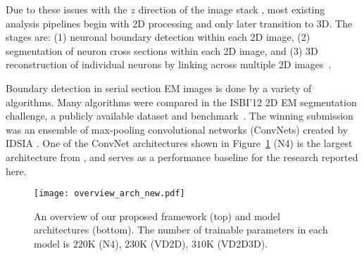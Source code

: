 \documentclass{article} %
\begin{document}
Due to these issues with the $z$ direction of the image stack
\cite{Tasdizen2014,Jurrus2010}, most existing analysis pipelines begin
with 2D processing and only later transition to 3D.  The stages are:
(1) neuronal boundary detection within each 2D image, (2)
segmentation of neuron cross sections within each 2D image, and (3) 3D
reconstruction of individual neurons by linking across multiple 2D
images~\cite{Takemura2013,Liu2014}.





Boundary detection in serial section EM images is done by a variety of
algorithms. Many algorithms were compared in the ISBI'12 2D EM
segmentation challenge, a publicly available dataset and benchmark~\cite{ISBI2012}.
The winning submission was an ensemble of max-pooling convolutional networks (ConvNets)
created by IDSIA \cite{Ciresan2012}. One of the
ConvNet architectures shown in Figure~\ref{overview} (N4) is the largest architecture from \cite{Ciresan2012}, and serves as a
performance baseline for the research reported here.

\begin{figure}[!b]
\begin{center}
\texttt{[image: overview\_arch\_new.pdf]}
\end{center}
\caption{An overview of our proposed framework (top) and model architectures (bottom). The number of trainable parameters in each model is $220$K (N4), $230$K (VD2D), $310$K (VD2D3D).}
\label{overview}
\end{figure}
\end{document}
